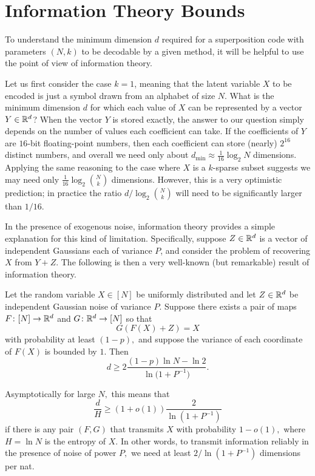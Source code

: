 \section{Information Theory Bounds \label{sec:information}}

To understand the minimum dimension $d$ required for a superposition code with parameters $(N, k)$ to be decodable by a given method, it will be helpful to use the point of view of information theory.

Let us first consider the case $k = 1$, meaning that the latent variable $X$ to be encoded is just a symbol drawn from an alphabet of size $N.$ What is the minimum dimension $d$ for which each value of $X$ can be represented by a vector $Y \in \mathbb{R}^d$? When the vector $Y$ is stored exactly, the answer to our question simply depends on the number of values each coefficient can take. If the coefficients of $Y$ are $16$-bit floating-point numbers, then each coefficient can store (nearly) $2^{16}$ distinct numbers, and overall we need only about $d_\text{min} \approx \frac 1 {16} \log_2 N$ dimensions. Applying the same reasoning to the case where $X$ is a $k$-sparse subset suggests we may need only $\frac 1 {16} \log_2 \binom N k$ dimensions. However, this is a very optimistic prediction; in practice the ratio $d / \log_2 \binom N k$ will need to be significantly larger than $1/16.$

In the presence of exogenous noise, information theory provides a simple explanation for this kind of limitation. Specifically, suppose $Z \in \mathbb{R}^d$ is a vector of independent Gaussians each of variance $P$, and consider the problem of recovering $X$ from $Y + Z.$ The following is then a very well-known (but remarkable) result of information theory.

\begin{proposition} \label{prop:information}
    Let the random variable $X \in [N]$ be uniformly distributed and let $Z \in \mathbb{R}^d$ be independent Gaussian noise of variance $P.$ Suppose there exists a pair of maps $F \colon [N] \to \mathbb{R}^d$ and $G \colon \mathbb{R}^d \to [N]$ so that
	$$
		G(F(X) + Z) = X
	$$
	with probability at least $(1 - p),$ and suppose the variance of each coordinate of $F(X)$ is bounded by $1.$ Then
	$$
	d \geq 2 \frac{(1 - p) \ln N - \ln 2}{\ln \bigl( 1 + P^{-1} \bigr)}.
	$$
\end{proposition}

Asymptotically for large $N,$ this means that
$$
\frac d {H} \ge (1 + o(1)) \frac 2 {\ln (1 + P^{-1})}
$$
if there is any pair $(F, G)$ that transmits $X$ with probability $1 - o(1),$ where $H = \ln N$ is the entropy of $X.$ In other words, to transmit information reliably in the presence of noise of power $P,$ we need at least $2 / \ln(1 + P^{-1})$ dimensions per nat.

